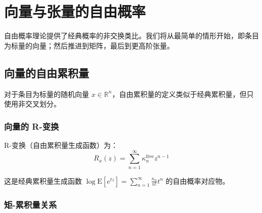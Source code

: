 \section{向量与张量的自由概率}

自由概率理论提供了经典概率的非交换类比。我们将从最简单的情形开始，即条目为标量的向量；然后推进到矩阵，最后到更高阶张量。

\subsection{向量的自由累积量}

对于条目为标量的随机向量 $x \in \mathbb{R}^n$，自由累积量的定义类似于经典累积量，但只使用非交叉划分。

\subsubsection{向量的 R-变换}

R-变换（自由累积量生成函数）为：
\[
   R_x(z) = \sum_{n=1}^{\infty} \kappa_n^{\text{free}} z^{n-1}
\]

这是经典累积量生成函数 $\log \mathrm{E}[e^{tz}] = \sum_{n=1}^{\infty} \frac{\kappa_n}{n!} t^n$ 的自由概率对应物。

\subsubsection{矩-累积量关系}

